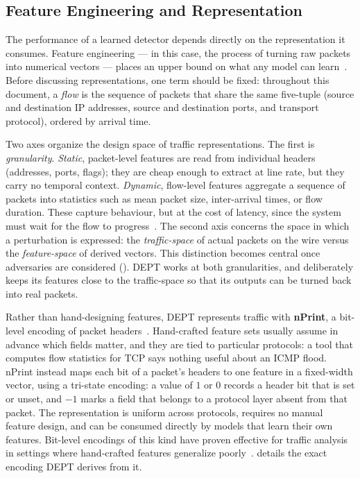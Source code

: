 \subsection{Feature Engineering and Representation}\label{subsec:bg-features}
The performance of a learned detector depends directly on the representation it consumes.
Feature engineering --- in this case, the process of turning raw packets into numerical vectors --- places an
upper bound on what any model can learn~\cite{salim2026feature,ning2024study}. Before
discussing representations, one term should be fixed: throughout this document, a
\emph{flow} is the sequence of packets that share the same five-tuple (source and
destination \ac{IP} addresses, source and destination ports, and transport protocol), ordered by
arrival time.

Two axes organize the design space of traffic representations. The first is
\emph{granularity}. \emph{Static}, packet-level features are read from individual headers
(addresses, ports, flags); they are cheap enough to extract at line rate, but they carry no
temporal context. \emph{Dynamic}, flow-level features aggregate a sequence of packets into
statistics such as mean packet size, inter-arrival times, or flow duration. These capture
behaviour, but at the cost of latency, since the system must wait for the flow to
progress~\cite{apruzzese2023sok}. The second axis concerns the space in which a
perturbation is expressed: the \emph{traffic-space} of actual packets on the wire versus
the \emph{feature-space} of derived vectors. This distinction becomes central once
adversaries are considered (). DEPT works at both
granularities, and deliberately keeps its features close to the traffic-space so that its
outputs can be turned back into real packets.

Rather than hand-designing features, DEPT represents traffic with \textbf{nPrint}, a
bit-level encoding of packet headers~\cite{holland2021nprint}. Hand-crafted feature sets
usually assume in advance which fields matter, and they are tied to particular protocols: a
tool that computes flow statistics for \ac{TCP} says nothing useful about an \ac{ICMP} flood. nPrint
instead maps each bit of a packet's headers to one feature in a fixed-width vector, using a
tri-state encoding: a value of $1$ or $0$ records a header bit that is set or unset, and
$-1$ marks a field that belongs to a protocol layer absent from that packet. The
representation is uniform across protocols, requires no manual feature design, and can be
consumed directly by models that learn their own features. Bit-level encodings of this kind
have proven effective for traffic analysis in settings where hand-crafted features
generalize poorly~\cite{holland2021nprint,wang2017end,lotfollahi2020deep}. 
details the exact encoding DEPT derives from it.

